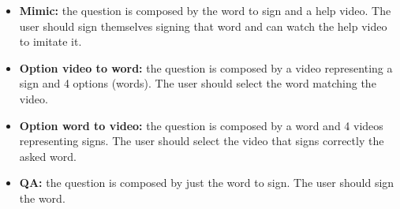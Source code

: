 \begin{itemize}[noitemsep]
    \item \textbf{Mimic:} the question is composed by the word to sign and a help video. The user should sign themselves signing that word and can watch the help video to imitate it.
    \item \textbf{Option video to word:} the question is composed by a video representing a sign and 4 options (words). The user should select the word matching the video.
    \item \textbf{Option word to video:} the question is composed by a word and 4 videos representing signs. The user should select the video that signs correctly the asked word.
    \item \textbf{QA:} the question is composed by just the word to sign. The user should sign the word.
\end{itemize}
